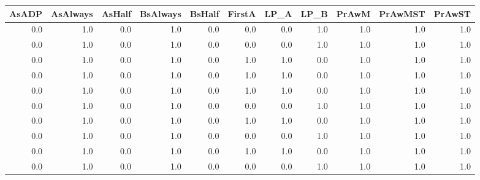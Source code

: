\begin{tabular}{rrrrrrrrrrr}
\toprule
 AsADP &  AsAlways &  AsHalf &  BsAlways &  BsHalf &  FirstA &  LP\_A &  LP\_B &  PrAwM &  PrAwMST &  PrAwST \\
\midrule
   0.0 &       1.0 &     0.0 &       1.0 &     0.0 &     0.0 &   0.0 &   1.0 &    1.0 &      1.0 &     1.0 \\
   0.0 &       1.0 &     0.0 &       1.0 &     0.0 &     0.0 &   0.0 &   1.0 &    1.0 &      1.0 &     1.0 \\
   0.0 &       1.0 &     0.0 &       1.0 &     0.0 &     1.0 &   1.0 &   0.0 &    1.0 &      1.0 &     1.0 \\
   0.0 &       1.0 &     0.0 &       1.0 &     0.0 &     1.0 &   1.0 &   0.0 &    1.0 &      1.0 &     1.0 \\
   0.0 &       1.0 &     0.0 &       1.0 &     0.0 &     1.0 &   1.0 &   0.0 &    1.0 &      1.0 &     1.0 \\
   0.0 &       1.0 &     0.0 &       1.0 &     0.0 &     0.0 &   0.0 &   1.0 &    1.0 &      1.0 &     1.0 \\
   0.0 &       1.0 &     0.0 &       1.0 &     0.0 &     1.0 &   1.0 &   0.0 &    1.0 &      1.0 &     1.0 \\
   0.0 &       1.0 &     0.0 &       1.0 &     0.0 &     0.0 &   0.0 &   1.0 &    1.0 &      1.0 &     1.0 \\
   0.0 &       1.0 &     0.0 &       1.0 &     0.0 &     1.0 &   1.0 &   0.0 &    1.0 &      1.0 &     1.0 \\
   0.0 &       1.0 &     0.0 &       1.0 &     0.0 &     0.0 &   0.0 &   1.0 &    1.0 &      1.0 &     1.0 \\
\bottomrule
\end{tabular}
